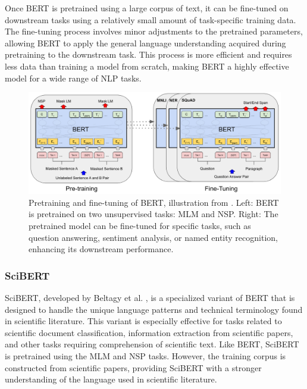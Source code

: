 Once BERT is pretrained using a large corpus of text, it can be fine-tuned on downstream tasks using a relatively small amount of task-specific training data. The fine-tuning process involves minor adjustments to the pretrained parameters, allowing BERT to apply the general language understanding acquired during pretraining to the downstream task. This process is more efficient and requires less data than training a model from scratch, making BERT a highly effective model for a wide range of \ac{NLP} tasks.

\begin{figure}[ht]
    \centering
    \includegraphics[width=\textwidth]{screenshots/bert.png}
    \caption[Pretraining and Fine-Tuning of BERT]{Pretraining and fine-tuning of BERT, illustration from \cite{DevlinBERTPretraining2019}.
        Left: BERT is pretrained on two unsupervised tasks: \acl{MLM} and \acl{NSP}. Right: The pretrained model can be fine-tuned for specific tasks, such as question answering, sentiment analysis, or named entity recognition, enhancing its downstream performance.}
    \label{fig:bert}
\end{figure}


\subsubsection*{SciBERT}

SciBERT, developed by Beltagy et al. \cite{BeltagySciBERTPretrained2019}, is a specialized variant of BERT that is designed to handle the unique language patterns and technical terminology found in scientific literature. This variant is especially effective for tasks related to scientific document classification, information extraction from scientific papers, and other tasks requiring comprehension of scientific text. Like BERT, SciBERT is pretrained using the \ac{MLM} and \ac{NSP} tasks. However, the training corpus is constructed from scientific papers, providing SciBERT with a stronger understanding of the language used in scientific literature.

